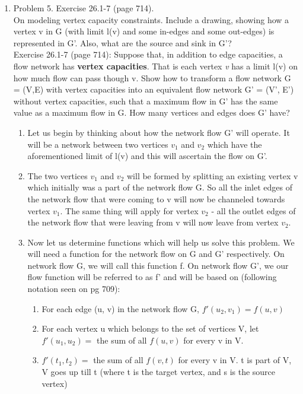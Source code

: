 \documentclass[11pt]{article}
\begin{document}
\begin{enumerate}
\pagebreak

\item Problem 5. Exercise 26.1-7 (page 714).\\
On modeling vertex capacity constraints. Include a drawing, showing how a vertex v in G (with limit l(v) and some in-edges and some out-edges) is represented in G'. Also, what are the source and sink in G'?\\

Exercise 26.1-7 (page 714):
Suppose that, in addition to edge capacities, a flow network has \textbf{vertex capacities}. That is each vertex \textit{v} has a limit l(v) on how much flow can pass though v. Show how to transform a flow network G = (V,E) with vertex capacities into an equivalent flow network G' = (V', E') without vertex capacities, such that a maximum flow in G' has the same value as a maximum flow in G. How many vertices and edges does G' have?
\begin{enumerate}
    \item Let us begin by thinking about how the network flow G' will operate. It will be a network between two vertices $v_1$ and $v_2$ which have the aforementioned limit of l(v) and this will ascertain the flow on G'. 
    \item The two vertices $v_1$ and $v_2$ will be formed by splitting an existing vertex v which initially was a part of the network flow G. So all the inlet edges of the network flow that were coming to v will now be channeled towards vertex $v_1$. The same thing will apply for vertex $v_2$ - all the outlet edges of the network flow that were leaving from v will now leave from vertex $v_2$.
    \item Now let us determine functions which will help us solve this problem. We will need a function for the network flow on G and G' respectively. On network flow G, we will call this function f. On network flow G', we our flow function will be referred to as f' and will be based on (following notation seen on pg 709):
    \begin{enumerate}
        \item For each edge (u, v) in the network flow G, $f'(u_2, v_1) = f(u, v)$
        \item For each vertex u which belongs to the set of vertices V, let $f'(u_1, u_2) = $ the sum of all $f(u, v)$ for every v in V.
        \item $f'(t_1, t_2) = $ the sum of all $f(v, t)$ for every v in V. t is part of V, V goes up till t (where t is the target vertex, and s is the source vertex)

\end{enumerate}
\end{enumerate}
\end{enumerate}
\end{document}
